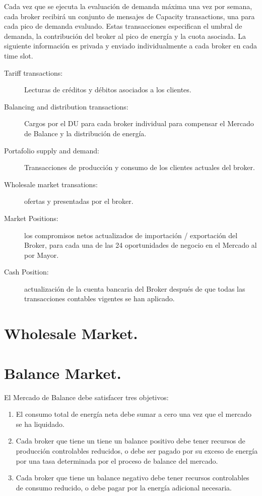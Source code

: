 Cada vez que se ejecuta la evaluación de demanda máxima una vez por semana, cada broker recibirá un conjunto de mensajes de Capacity transactions, una para cada pico de demanda evaluado. Estas transacciones especifican el umbral de demanda, la contribución del broker al pico de energía y la cuota asociada. La siguiente información es privada y enviado individualmente a cada broker en cada time slot.
\begin{description}
	\item [Tariff transactions:] Lecturas de créditos y débitos asociados a los clientes.
	\item [Balancing and distribution transactions:] Cargos por el DU para cada broker individual para compensar el Mercado de Balance y la distribución de energía.
	\item [Portafolio supply and demand:] Transacciones de producción y consumo de los clientes actuales del broker.
	\item [Wholesale market transations:] ofertas y presentadas por el broker.
	\item [Market Positions:] los compromisos netos actualizados de importación / exportación del Broker, para cada una de las 24 oportunidades de negocio en el Mercado al por Mayor.
	\item [Cash Position: ]actualización de la cuenta bancaria del Broker después de que todas las transacciones contables vigentes se han aplicado.
\end{description}

\section{Wholesale Market.}

\section{Balance Market.}

El Mercado de Balance debe satisfacer tres objetivos:
\begin{enumerate}
	\item El consumo total de energía neta debe sumar a cero una vez que el mercado se ha liquidado.     
	\item Cada broker que tiene un tiene un balance positivo debe tener recursos de producción controlables reducidos, o debe ser pagado por su exceso de energía por una tasa determinada por el proceso de balance del mercado.      
	\item Cada broker que tiene un balance negativo debe tener recursos controlables de consumo reducido, o debe pagar por la energía adicional necesaria.	
\end{enumerate}

